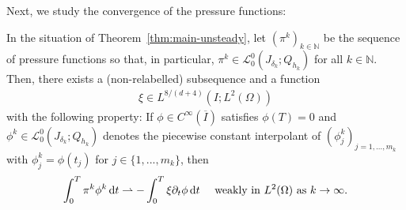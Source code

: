 \documentclass[reqno,a4paper]{amsart}
\def\d{{\rm d}}
\def\dt{\,\d t}
\def\wconv{\rightharpoonup}
\begin{document}
	Next, we study the convergence of the pressure functions:	
	\begin{lemma} \label{lem:unst-conv-pi}
	In the situation  of Theorem~\ref{thm:main-unsteady}, let $(\pi^k)_{k \in \mathbb{N}}$  be the sequence of pressure functions so that, in particular,  $\pi^k \in  \mathcal{L}^0_0(J_{\delta_k};Q_{h_k})$ for all $k\in\mathbb{N}$. 
		Then, there exists a (non-relabelled)  subsequence 
		and a function 
		\begin{align*}
			\xi \in L^{8/(d+4)}(I;L^2(\Omega))
		\end{align*}
		with the following property: If $\phi \in C^{\infty}(\overline I)$ satisfies $\phi(T) = 0$ and $\phi^k \in  \mathcal{L}^0_0(J_{\delta_k};Q_{h_k})$ denotes the piecewise constant interpolant of $(\phi^k_j)_{j = 1, \ldots, m_k}$ with $\phi^k_j = \phi(t_j)$ for $j\in\{1,...,m_{k}\}$, 
		then 
		\begin{align*}
			\int_0^T \pi^k \phi^k \dt \wconv -	\int_0^T \xi \partial_t \phi \dt \quad \text{ weakly in $L^2(\Omega)$ as   $k \to \infty$}.
		\end{align*}
	\end{lemma}
\end{document}
